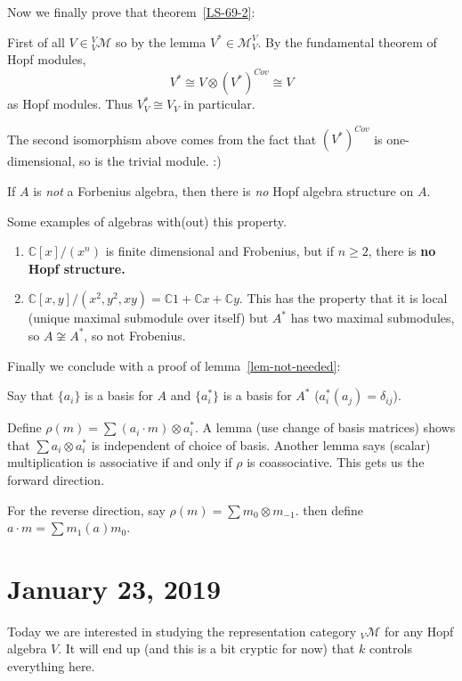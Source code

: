 \documentclass[12pt]{article}
\newcommand*{\C}{
\mathbb{C}
}
\begin{document}
Now we finally prove that theorem~\ref{LS-69-2}:
\begin{prf}
	First of all $V\in{^V_V\mathcal{M}}$ so by the lemma $V^*\in\mathcal{M}_V^V$. By the fundamental theorem of Hopf modules,
	\[V^*\cong V\otimes(V^*)^{Cov}\cong V\]
	as Hopf modules. Thus $V_V^*\cong V_V$ in particular.
\end{prf}
\begin{rmk}
	The second isomorphism above comes from the fact that $(V^*)^{Cov}$ is one-dimensional, so is the trivial module. :)
\end{rmk}
\begin{cor}
	If $A$ is \textit{not} a Forbenius algebra, then there is \textit{no} Hopf algebra structure on $A$.
\end{cor}
\begin{ex}
	Some examples of algebras with(out) this property.
	\begin{enumerate}
		\item $\C[x]/(x^n)$ is finite dimensional and Frobenius, but if $n\ge 2$, there is \textbf{no Hopf structure.}
		\item $\C[x,y]/(x^2,y^2,xy)=\C1+\C x+\C y$. This has the property that it is local (unique maximal submodule over itself)
		but $A^*$ has two maximal submodules, so $A\not\cong A^*$, so not Frobenius.
	\end{enumerate}
\end{ex}
Finally we conclude with a proof of lemma~\ref{lem-not-needed}:
\begin{prf}
	Say that $\{a_i\}$ is a basis for $A$ and $\{a_i^*\}$ is a basis for $A^*$ ($a_i^*(a_j)=\delta_{ij}$).

	Define $\rho(m)=\sum(a_i\cdot m)\otimes a_i^*$. A lemma (use change of basis matrices) shows that
	$\sum a_i\otimes a_i^*$ is independent of choice of basis. Another lemma says (scalar) multiplication is associative
	if and only if $\rho$ is coassociative. This gets us the forward direction.

	For the reverse direction, say $\rho(m)=\sum m_0\otimes m_{-1}.$ then define $a\cdot m=\sum m_1(a)m_0$.
\end{prf}

\section{January 23, 2019}
Today we are interested in studying the representation category $_V\mathcal{M}$ for any Hopf algebra $V$. It will end up
(and this is a bit cryptic for now) that $k$ controls everything here.
\end{document}
